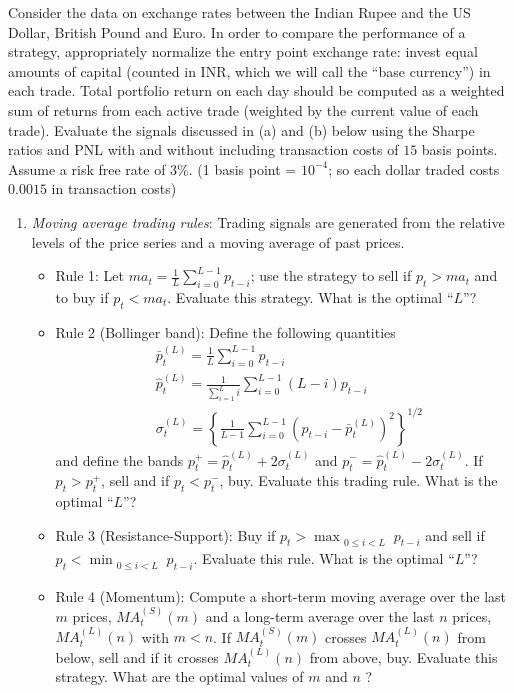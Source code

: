 \documentclass[12pt]{article}
\begin{document}
\begin{enumerate}
Consider the data on exchange rates between the Indian Rupee and the US Dollar, British Pound and Euro. In order to compare the performance of a strategy, appropriately normalize the entry point exchange rate: invest equal amounts of capital (counted in INR, which we will call the ``base currency'') in each trade. Total portfolio return on each day should be computed as a weighted sum of returns from each active trade (weighted by the current value of each trade). Evaluate the signals discussed in (a) and (b) below using the Sharpe ratios and PNL with and without including transaction costs of $15$ basis points. Assume a risk free rate of $3\%$. (1 basis point = $10^{-4}$; so each dollar traded costs $0.0015$ in transaction costs)
\begin{enumerate}
\item{\it Moving average trading rules}: Trading signals are generated from the relative levels of the price series and a moving average of past prices.
\begin{itemize}
\item  Rule 1: Let $ma_t = \frac{1}{L}\sum_{i=0}^{L-1}p_{t-i}$; use the strategy to sell if $p_t > ma_t$ and to buy if $p_t<ma_t$. Evaluate this strategy. What is the optimal ``$L$''?
\item Rule 2 (Bollinger band): Define the following quantities
\begin{align*}
&\bar p_t^{(L)} = \frac{1}{L}\sum_{i=0}^{L-1}p_{t-i}\\
&\hat p_t^{(L)} = \frac{1}{\sum_{i=1}^{L}i}\sum_{i=0}^{L-1}(L-i)p_{t-i}\\
&\sigma_t^{(L)} = \left\{\frac{1}{L-1}\sum_{i=0}^{L-1}\left(p_{t-i}-\bar p_t^{(L)}\right)^2\right\}^{1/2}
\end{align*}
and define the bands $p_t^+ = \hat p_t^{(L)} + 2\sigma_t^{(L)}$ and $p_t^- = \hat p_t^{(L)} - 2\sigma_t^{(L)}$. If $p_t>p_t^+$, sell and if $p_t<p_t^-$, buy. Evaluate this trading rule. What is the optimal ``$L$''?
\item Rule 3 (Resistance-Support): Buy if $p_t > \max_{\substack{0\le i< L}}p_{t-i}$ and sell if $p_t < \min_{\substack{0\le i< L}}p_{t-i}$. Evaluate this rule. What is the optimal ``$L$''?
\item Rule 4 (Momentum): Compute a short-term moving average over the last $m$ prices, $MA^{(S)}_t(m)$ and a long-term average over the last $n$ prices, $MA^{(L)}_t(n)$ with $m<n$. If $MA^{(S)}_t(m)$ crosses $MA^{(L)}_t(n)$ from below, sell and if it crosses $MA^{(L)}_t(n)$ from above, buy. Evaluate this strategy. What are the optimal values of $m$ and $n$ ?

\end{itemize}
\end{enumerate}
\end{enumerate}
\end{document}
